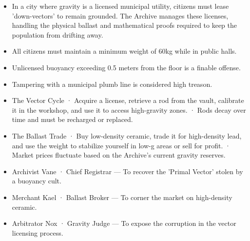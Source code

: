 \documentclass[10pt,a4paper]{article}
\newcommand{\heading}[1]{\par\vspace{5pt}{\color{teal}\bfseries #1}\par}
\begin{document}
\begin{minipage}[t]{0.48\linewidth}\fontsize{9}{12}\selectfont\raggedright\setlength{\parskip}{0pt}
\heading{世界概述}\begin{itemize}
\item In a city where gravity is a licensed municipal utility, citizens must lease 'down-vectors' to remain grounded. The Archive manages these licenses, handling the physical ballast and mathematical proofs required to keep the population from drifting away.
\end{itemize}
\heading{规则与制度}\begin{itemize}
\item All citizens must maintain a minimum weight of 60kg while in public halls.
\item Unlicensed buoyancy exceeding 0.5 meters from the floor is a finable offense.
\item Tampering with a municipal plumb line is considered high treason.
\end{itemize}
\heading{活动与压力}\begin{itemize}
\item The Vector Cycle · Acquire a license, retrieve a rod from the vault, calibrate it in the workshop, and use it to access high-gravity zones. · Rods decay over time and must be recharged or replaced.
\item The Ballast Trade · Buy low-density ceramic, trade it for high-density lead, and use the weight to stabilize yourself in low-g areas or sell for profit. · Market prices fluctuate based on the Archive's current gravity reserves.
\end{itemize}
\heading{人物与目标}\begin{itemize}
\item Archivist Vane · Chief Registrar — To recover the 'Primal Vector' stolen by a buoyancy cult.
\item Merchant Kael · Ballast Broker — To corner the market on high-density ceramic.
\item Arbitrator Nox · Gravity Judge — To expose the corruption in the vector licensing process.
\end{itemize}
\end{minipage}\hfill
\end{document}
